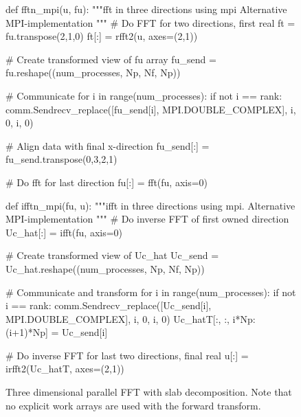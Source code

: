 \documentclass[11pt, oneside]{article}
\begin{document}
\begin{figure}
\begin{python}
def fftn_mpi(u, fu):
    """fft in three directions using mpi
    Alternative MPI-implementation
    """
    # Do FFT for two directions, first real
    ft = fu.transpose(2,1,0)
    ft[:] = rfft2(u, axes=(2,1))

    # Create transformed view of fu array
    fu_send = fu.reshape((num_processes, Np, Nf, Np))

    # Communicate
    for i in range(num_processes):
        if not i == rank:
            comm.Sendrecv_replace([fu_send[i], MPI.DOUBLE_COMPLEX], i, 0, i, 0)

    # Align data with final x-direction
    fu_send[:] = fu_send.transpose(0,3,2,1)

    # Do fft for last direction
    fu[:] = fft(fu, axis=0)

def ifftn_mpi(fu, u):
    """ifft in three directions using mpi.
    Alternative MPI-implementation
    """
    # Do inverse FFT of first owned direction
    Uc_hat[:] = ifft(fu, axis=0)

    # Create transformed view of Uc_hat
    Uc_send = Uc_hat.reshape((num_processes, Np, Nf, Np))

    # Communicate and transform
    for i in range(num_processes):
       if not i == rank:
           comm.Sendrecv_replace([Uc_send[i], MPI.DOUBLE_COMPLEX], i, 0, i, 0)
       Uc_hatT[:, :, i*Np:(i+1)*Np] = Uc_send[i]

    # Do inverse FFT for last two directions, final real
    u[:] = irfft2(Uc_hatT, axes=(2,1))

\end{python}
\caption{Three dimensional parallel FFT with slab decomposition. Note that no explicit work arrays are used with the forward transform.}
\label{fig:slabfft_sendrecv}
\end{figure}


\end{document}
